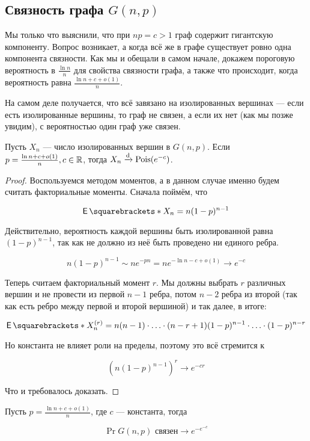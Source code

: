 \subsection{Связность графа $G(n, p)$}

Мы только что выяснили, что при $np = c > 1$ граф содержит гигантскую компоненту.
Вопрос возникает, а когда всё же в графе существует ровно одна компонента связности.
Как мы и обещали в самом начале, докажем пороговую вероятность в $\frac{\ln n}{n}$
для свойства связности графа, а также что происходит, когда вероятность равна
$\frac{\ln n + c + o(1)}{n}$.

На самом деле получается, что всё завязано на изолированных вершинах --- если есть
изолированные вершины, то граф не связен, а если их нет (как мы позже увидим),
с вероятностью один граф уже связен.

\begin{theorem}
  Пусть $X_n$ --- число изолированных вершин в $G(n, p)$. Если
  $p = \frac{\ln n + c + o(1)}{n}, c \in \mathbb{R}$, тогда $X_n \xrightarrow{\mathrm{d}} \mathrm{Pois}(e^{-c})$.
\end{theorem}

\begin{proof}
  Воспользуемся методом моментов, а в данном случае именно будем считать факториальные
  моменты. Сначала поймём, что

  \[
    \E{X_n} = n(1 - p)^{n - 1}
  \]

  Действительно, вероятность каждой вершины быть изолированной равна $(1 - p)^{n - 1}$,
  так как не должно из неё быть проведено ни единого ребра.

  \[
    n(1 - p)^{n - 1} \sim n e^{-pn} = n e^{-\ln n - c + o(1)} \to e^{-c}
  \]

  Теперь считаем факториальный момент $r$. Мы должны выбрать $r$ различных
  вершин и не провести из первой $n - 1$ ребра, потом $n - 2$ ребра из второй
  (так как есть ребро между первой и второй вершиной) и так далее, в итоге:

  \[
    \E{X_n^{(r)}} = n(n - 1)\cdot\ldots\cdot(n - r + 1)(1 - p)^{n - 1}\cdot\ldots\cdot
    (1 - p)^{n - r}
  \]

  Но константа не влияет роли на пределы, поэтому это всё стремится к 

  \[
    (n(1 - p)^{n - 1})^r \to e^{-cr}
  \]

  Что и требовалось доказать.
\end{proof}

\begin{theorem}
  Пусть $p = \frac{\ln n + c + o(1)}{n}$, где $c$ --- константа, тогда

  \[
    \Pr{G(n, p) \text{ связен}} \to e^{-e^{-c}}
  \]
\end{theorem}

